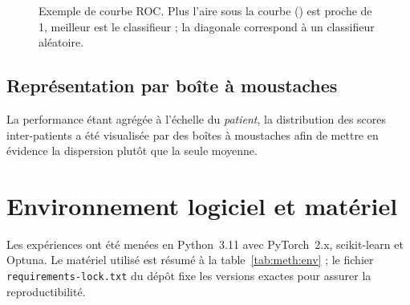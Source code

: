 \begin{figure}[H]
  \centering
  \caption{Exemple de courbe ROC. Plus l'aire sous la courbe (\AUROC{}) est proche de 1, meilleur est le classifieur ; la diagonale correspond à un classifieur aléatoire.}
  \label{fig:meth:roc}
\end{figure}

\subsection{Représentation par boîte à moustaches}
La performance étant agrégée à l'échelle du \emph{patient}, la distribution des scores inter-patients a été visualisée par des boîtes à moustaches afin de mettre en évidence la dispersion plutôt que la seule moyenne.

\section{Environnement logiciel et matériel}
\label{sec:meth:env}

Les expériences ont été menées en Python~3.11 avec PyTorch~2.x, scikit-learn et Optuna. Le matériel utilisé est résumé à la table~\ref{tab:meth:env} ; le fichier \texttt{requirements-lock.txt} du dépôt fixe les versions exactes pour assurer la reproductibilité.

